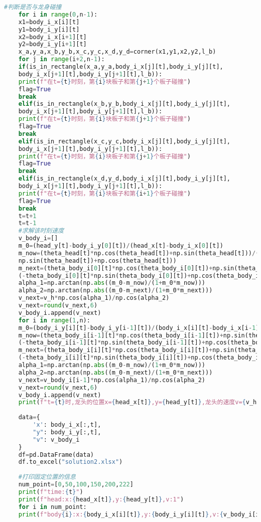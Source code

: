 \documentclass[withoutpreface,bwprint]{cumcmthesis} %
\begin{document}
\begin{lstlisting}[language=Python]
	#判断是否与龙身碰撞
	for i in range(0,n-1):
	x1=body_i_x[i][t]
	y1=body_i_y[i][t]
	x2=body_i_x[i+1][t]
	y2=body_i_y[i+1][t]
	x_a,y_a,x_b,y_b,x_c,y_c,x_d,y_d=corner(x1,y1,x2,y2,l_b)
	for j in range(i+2,n-1):
	if(is_in_rectangle(x_a,y_a,body_i_x[j][t],body_i_y[j][t],
	body_i_x[j+1][t],body_i_y[j+1][t],l_b)):
	print(f"在t={t}时刻，第{i}块板子和第{j+1}个板子碰撞")
	flag=True
	break
	elif(is_in_rectangle(x_b,y_b,body_i_x[j][t],body_i_y[j][t],
	body_i_x[j+1][t],body_i_y[j+1][t],l_b)):
	print(f"在t={t}时刻，第{i}块板子和第{j+1}个板子碰撞")
	flag=True
	break
	elif(is_in_rectangle(x_c,y_c,body_i_x[j][t],body_i_y[j][t],
	body_i_x[j+1][t],body_i_y[j+1][t],l_b)):
	print(f"在t={t}时刻，第{i}块板子和第{j+1}个板子碰撞")
	flag=True
	break
	elif(is_in_rectangle(x_d,y_d,body_i_x[j][t],body_i_y[j][t],
	body_i_x[j+1][t],body_i_y[j+1][t],l_b)):
	print(f"在t={t}时刻，第{i}块板子和第{i+1}个板子碰撞")
	flag=True
	break
	t=t+1
	t=t-1
	#求解该时刻速度
	v_body_i=[]
	m_0=(head_y[t]-body_i_y[0][t])/(head_x[t]-body_i_x[0][t])
	m_now=(theta_head[t]*np.cos(theta_head[t])+np.sin(theta_head[t]))/(-theta_head[t]*
	np.sin(theta_head[t])+np.cos(theta_head[t]))
	m_next=(theta_body_i[0][t]*np.cos(theta_body_i[0][t])+np.sin(theta_body_i[0][t]))/
	(-theta_body_i[0][t]*np.sin(theta_body_i[0][t])+np.cos(theta_body_i[0][t]))
	alpha_1=np.arctan(np.abs((m_0-m_now)/(1+m_0*m_now)))
	alpha_2=np.arctan(np.abs((m_0-m_next)/(1+m_0*m_next)))
	v_next=v_h*np.cos(alpha_1)/np.cos(alpha_2)
	v_next=round(v_next,6)
	v_body_i.append(v_next)
	for i in range(1,n):
	m_0=(body_i_y[i][t]-body_i_y[i-1][t])/(body_i_x[i][t]-body_i_x[i-1][t])
	m_now=(theta_body_i[i-1][t]*np.cos(theta_body_i[i-1][t])+np.sin(theta_body_i[i-1][t]))/
	(-theta_body_i[i-1][t]*np.sin(theta_body_i[i-1][t])+np.cos(theta_body_i[i-1][t]))
	m_next=(theta_body_i[i][t]*np.cos(theta_body_i[i][t])+np.sin(theta_body_i[i][t]))/
	(-theta_body_i[i][t]*np.sin(theta_body_i[i][t])+np.cos(theta_body_i[i][t]))
	alpha_1=np.arctan(np.abs((m_0-m_now)/(1+m_0*m_now)))
	alpha_2=np.arctan(np.abs((m_0-m_next)/(1+m_0*m_next)))
	v_next=v_body_i[i-1]*np.cos(alpha_1)/np.cos(alpha_2)
	v_next=round(v_next,6)
	v_body_i.append(v_next)
	print(f"t={t}时,龙头的位置x={head_x[t]},y={head_y[t]},龙头的速度v={v_h}")
	
	data={
		'x': body_i_x[:,t],
		"y": body_i_y[:,t],
		"v": v_body_i
	}
	df=pd.DataFrame(data)
	df.to_excel("solution2.xlsx")
	
	#打印固定位置的信息
	num_point=[0,50,100,150,200,222]
	print(f"time:{t}")
	print(f"head:x:{head_x[t]},y:{head_y[t]},v:1")
	for i in num_point:
	print(f"body{i}:x:{body_i_x[i][t]},y:{body_i_y[i][t]},v:{v_body_i[i]}")
	\end{lstlisting}
\end{document}
